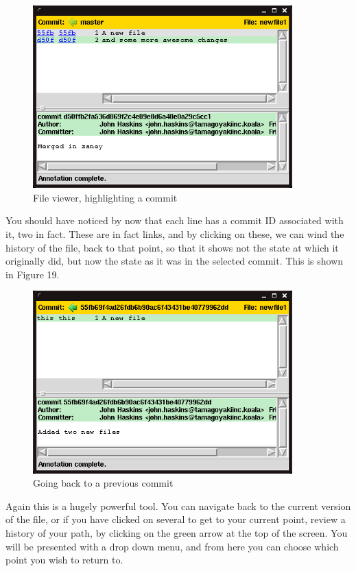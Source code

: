 \begin{figure}[hbt]
\centering
\includegraphics[width=10cm]{images/f-w5-d18.png}
\caption{File viewer, highlighting a commit}
\end{figure} 

You should have noticed by now that each line has a commit ID associated with it, two in fact.  These are in fact links, and by clicking on these, we can wind the history of the file, back to that point, so that it shows not the state at which it originally did, but now the state as it was in the selected commit.  This is shown in Figure 19.

\begin{figure}[hbt]
\centering
\includegraphics[width=10cm]{images/f-w5-d19.png}
\caption{Going back to a previous commit}
\end{figure} 

Again this is a hugely powerful tool.  You can navigate back to the current version of the file, or if you have clicked on several to get to your current point, review a history of your path, by clicking on the green arrow at the top of the screen.  You will be presented with a drop down menu, and from here you can choose which point you wish to return to.  

